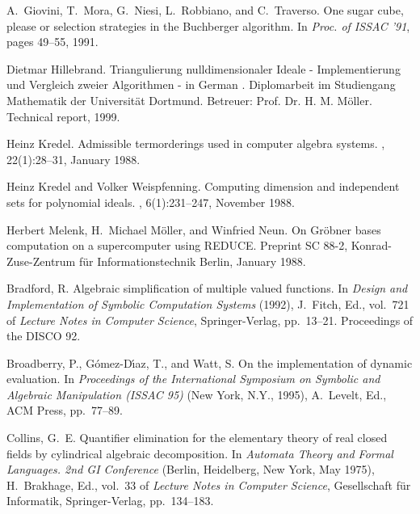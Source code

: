 \begin{thebibliography}{999}
A.~Giovini, T.~Mora, G.~Niesi, L.~Robbiano, and C.~Traverso.
\newblock One sugar cube, please or selection strategies in the {B}uchberger
  algorithm.
\newblock In {\em Proc. of {ISSAC} '91}, pages 49--55, 1991.

Dietmar Hillebrand.
\newblock Triangulierung nulldimensionaler {I}deale - {I}mplementierung und
  {V}ergleich zweier {A}lgorithmen - in {G}erman . {D}iplomarbeit im
  {S}tudiengang {M}athematik der {U}niversit{\"a}t {D}ortmund. {B}etreuer:
  Prof. {D}r. {H}. {M}. {M}{\"o}ller.
\newblock Technical report, 1999.

Heinz Kredel.
\newblock Admissible termorderings used in computer algebra systems.
, 22(1):28--31, January 1988.

Heinz Kredel and Volker Weispfenning.
\newblock Computing dimension and independent sets for polynomial ideals.
, 6(1):231--247, November 1988.

Herbert Melenk, H.~Michael M{\"o}ller, and Winfried Neun.
\newblock On {G}r{\"o}bner bases computation on a supercomputer using {REDUCE}.
\newblock Preprint SC 88-2, Konrad-Zuse-Zentrum f{\"u}r Informationstechnik
  Berlin, January 1988.


{Bradford, R.}
\newblock Algebraic simplification of multiple valued functions.
\newblock In {\em Design and Implementation of Symbolic Computation Systems\/}
  (1992), J.~Fitch, Ed., vol.~721 of {\em Lecture Notes in Computer Science},
  Springer-Verlag, pp.~13--21.
\newblock Proceedings of the DISCO 92.

{Broadberry, P., G\'omez-D\'{\i}az, T., and Watt, S.}
\newblock On the implementation of dynamic evaluation.
\newblock In {\em Proceedings of the International Symposium on Symbolic and
  Algebraic Manipulation (ISSAC 95)\/} (New York, N.Y., 1995), A.~Levelt, Ed.,
  ACM Press, pp.~77--89.

{Collins, G.~E.}
\newblock Quantifier elimination for the elementary theory of real closed
  fields by cylindrical algebraic decomposition.
\newblock In {\em Automata Theory and Formal Languages. 2nd GI Conference\/}
  (Berlin, Heidelberg, New York, May 1975), H.~Brakhage, Ed., vol.~33 of {\em
  Lecture Notes in Computer Science}, Gesellschaft f\"ur Informatik,
  Springer-Verlag, pp.~134--183.


\end{thebibliography}

